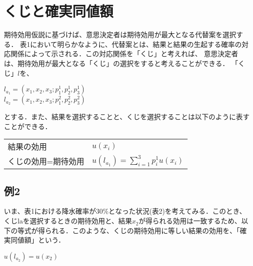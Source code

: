 \documentclass[a4j,12pt]{jsarticle}
\begin{document}
\newpage

\section{くじと確実同値額}
期待効用仮説に基づけば、意思決定者は期待効用が最大となる代替案を選択する．
表1において明らかなように、代替案とは、結果と結果の生起する確率の対応関係によって示される．この対応関係を「くじ」と考えれば、
意思決定者は、期待効用が最大となる「くじ」の選択をすると考えることができる．
「くじ」$l$を、

\begin{center}
$l_{a_1}=(x_1,x_2,x_3 ; p_1^1,p_2^1,p_3^1)$ \\
$l_{a_2}=(x_1,x_2,x_3 ; p_1^2,p_2^2,p_3^2)$
\end{center}

とする．また、結果を選択することと、くじを選択することは以下のように表すことができる．


\begin{center}
\begin{tabular}{ll} 	
結果の効用 & $u(x_i)$ \\
くじの効用=期待効用 & $\displaystyle u(l_{a_1})=\sum_{i=1}^3 p_i^1 u(x_i)$ \\
\end{tabular}
\end{center}

\subsection{例2}
いま、表1における降水確率が30\%となった状況(表2)を考えてみる．このとき、くじlaを選択するときの期待効用と、結果$x_2$が得られる効用は一致するため、以下の等式が得られる．このような、くじの期待効用に等しい結果の効用を、「確実同値額」という．

\begin{center}
$\displaystyle u(l_{a_2})=u(x_2)$ \\
\end{center}
\end{document}
